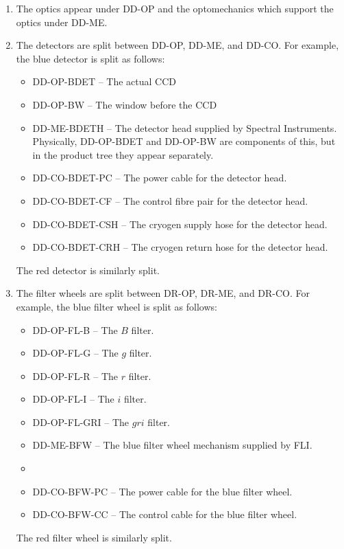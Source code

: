 \documentclass{article}
\begin{document}
\begin{enumerate}
\item
The optics appear under DD-OP and the optomechanics which support the optics under DD-ME.
\item
The detectors are split between DD-OP, DD-ME, and DD-CO. For example, the blue detector is split as follows:
\begin{itemize}
\item
DD-OP-BDET -- The actual CCD
\item
DD-OP-BW -- The window before the CCD
\item
DD-ME-BDETH -- The detector head supplied by Spectral Instruments. Physically, DD-OP-BDET and DD-OP-BW are components of this, but in the product tree they appear separately.
\item
DD-CO-BDET-PC -- The power cable for the detector head.
\item
DD-CO-BDET-CF -- The control fibre pair for the detector head.
\item
DD-CO-BDET-CSH -- The cryogen supply hose for the detector head.
\item
DD-CO-BDET-CRH -- The cryogen return hose for the detector head.
\end{itemize}
The red detector is similarly split.
\item
The filter wheels are split between DR-OP, DR-ME, and DR-CO. For example, the blue filter wheel is split as follows:
\begin{itemize}
\item DD-OP-FL-B -- The $B$ filter.
\item DD-OP-FL-G -- The $g$ filter.
\item DD-OP-FL-R -- The $r$ filter.
\item DD-OP-FL-I -- The $i$ filter.
\item DD-OP-FL-GRI -- The $gri$ filter.
\item
DD-ME-BFW -- The blue filter wheel mechanism supplied by FLI.
\item
\item
DD-CO-BFW-PC -- The power cable for the blue filter wheel.
\item
DD-CO-BFW-CC -- The control cable for the blue filter wheel.
\end{itemize}
The red filter wheel is similarly split.
\end{enumerate}
\end{document}
